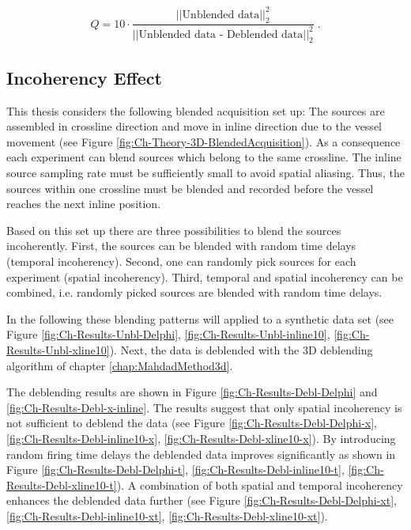 \begin{equation}
	Q = 10 \cdot \frac{\left|\left|\text{Unblended data}\right|\right| _2 ^2}{\left|\left|\text{Unblended data - Deblended data}\right|\right| _2 ^2} \;.	
\end{equation}

\subsection*{Incoherency Effect}

This thesis considers the following blended acquisition set up: The sources are assembled in crossline direction and move in inline direction due to the vessel movement (see Figure \ref{fig:Ch-Theory-3D-BlendedAcquisition}). As a consequence each experiment can blend sources which belong to the same crossline. The inline source sampling rate must be sufficiently small to avoid spatial aliasing. Thus, the sources within one crossline must be blended and recorded before the vessel reaches the next inline position.

Based on this set up there are three possibilities to blend the sources incoherently. First, the sources can be blended with random time delays (temporal incoherency). Second, one can randomly pick sources for each experiment (spatial incoherency). Third, temporal and spatial incoherency can be combined, i.e. randomly picked sources are blended with random time delays.

In the following these blending patterns will applied to a synthetic data set (see Figure \ref{fig:Ch-Results-Unbl-Delphi}, \ref{fig:Ch-Results-Unbl-inline10}, \ref{fig:Ch-Results-Unbl-xline10}). Next, the data is deblended with the 3D deblending algorithm of chapter \ref{chap:MahdadMethod3d}. 

The deblending results are shown in Figure \ref{fig:Ch-Results-Debl-Delphi} and \ref{fig:Ch-Results-Debl-x-inline}. The results suggest that only spatial incoherency is not sufficient to deblend the data (see Figure \ref{fig:Ch-Results-Debl-Delphi-x}, \ref{fig:Ch-Results-Debl-inline10-x}, \ref{fig:Ch-Results-Debl-xline10-x}). By introducing random firing time delays the deblended data improves significantly as shown in Figure \ref{fig:Ch-Results-Debl-Delphi-t}, \ref{fig:Ch-Results-Debl-inline10-t}, \ref{fig:Ch-Results-Debl-xline10-t}). A combination of both spatial and temporal incoherency enhances the deblended data further (see Figure \ref{fig:Ch-Results-Debl-Delphi-xt}, \ref{fig:Ch-Results-Debl-inline10-xt}, \ref{fig:Ch-Results-Debl-xline10-xt}).

